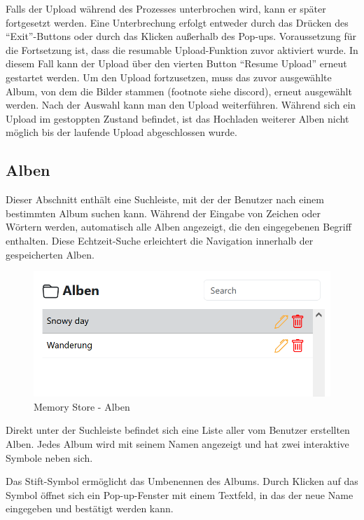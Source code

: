 Falls der Upload während des Prozesses unterbrochen wird, kann er später fortgesetzt 
werden. Eine Unterbrechung erfolgt entweder durch das Drücken des ``Exit''-Buttons 
oder durch das Klicken au\ss{}erhalb des Pop-ups. Voraussetzung für die Fortsetzung ist, 
dass die resumable Upload-Funktion zuvor aktiviert wurde. In diesem Fall kann der 
Upload über den vierten Button ``Resume Upload'' erneut gestartet werden. Um den 
Upload fortzusetzen, muss das zuvor ausgewählte Album, von dem die Bilder stammen 
(footnote siehe discord), erneut ausgewählt werden. Nach der Auswahl kann man den 
Upload weiterführen. Während sich ein Upload im gestoppten Zustand befindet, ist das 
Hochladen weiterer Alben nicht möglich bis der laufende Upload abgeschlossen wurde.

\subsection{Alben}

Dieser Abschnitt enthält eine Suchleiste, mit der der Benutzer nach einem bestimmten 
Album suchen kann. Während der Eingabe von Zeichen oder Wörtern werden, automatisch 
alle Alben angezeigt, die den eingegebenen Begriff enthalten. Diese Echtzeit-Suche 
erleichtert die Navigation innerhalb der gespeicherten Alben.

\begin{figure}
    \centering
    \includegraphics[scale=0.5]{pics/memory_store_teil2.PNG}
    \caption{Memory Store - Alben}
    \label{fig:memory-store-alben}
\end{figure}

Direkt unter der Suchleiste befindet sich eine Liste aller vom Benutzer erstellten 
Alben. Jedes Album wird mit seinem Namen angezeigt und hat zwei interaktive Symbole 
neben sich.

Das Stift-Symbol ermöglicht das Umbenennen des Albums. Durch Klicken auf das Symbol 
öffnet sich ein Pop-up-Fenster mit einem Textfeld, in das der neue Name eingegeben 
und bestätigt werden kann.

